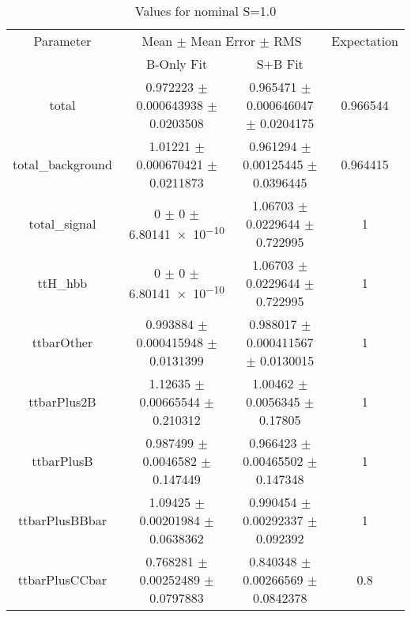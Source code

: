 \begin{table}
\centering
\caption{Values for nominal S=1.0}
\begin{tabular}{cccc}
\toprule
Parameter & \multicolumn{2}{c}{Mean $\pm$ Mean Error $\pm$ RMS} & Expectation\\
 & B-Only Fit & S+B Fit & \\
\midrule
total & \num{0.972223} $\pm$ \num{0.000643938} $\pm$ \num{0.0203508} & \num{0.965471} $\pm$ \num{0.000646047} $\pm$ \num{0.0204175} & \num{0.966544}\\
total\_background & \num{1.01221} $\pm$ \num{0.000670421} $\pm$ \num{0.0211873} & \num{0.961294} $\pm$ \num{0.00125445} $\pm$ \num{0.0396445} & \num{0.964415}\\
total\_signal & \num{0} $\pm$ \num{0} $\pm$ \num{6.80141e-10} & \num{1.06703} $\pm$ \num{0.0229644} $\pm$ \num{0.722995} & \num{1}\\
ttH\_hbb & \num{0} $\pm$ \num{0} $\pm$ \num{6.80141e-10} & \num{1.06703} $\pm$ \num{0.0229644} $\pm$ \num{0.722995} & \num{1}\\
ttbarOther & \num{0.993884} $\pm$ \num{0.000415948} $\pm$ \num{0.0131399} & \num{0.988017} $\pm$ \num{0.000411567} $\pm$ \num{0.0130015} & \num{1}\\
ttbarPlus2B & \num{1.12635} $\pm$ \num{0.00665544} $\pm$ \num{0.210312} & \num{1.00462} $\pm$ \num{0.0056345} $\pm$ \num{0.17805} & \num{1}\\
ttbarPlusB & \num{0.987499} $\pm$ \num{0.0046582} $\pm$ \num{0.147449} & \num{0.966423} $\pm$ \num{0.00465502} $\pm$ \num{0.147348} & \num{1}\\
ttbarPlusBBbar & \num{1.09425} $\pm$ \num{0.00201984} $\pm$ \num{0.0638362} & \num{0.990454} $\pm$ \num{0.00292337} $\pm$ \num{0.092392} & \num{1}\\
ttbarPlusCCbar & \num{0.768281} $\pm$ \num{0.00252489} $\pm$ \num{0.0797883} & \num{0.840348} $\pm$ \num{0.00266569} $\pm$ \num{0.0842378} & \num{0.8}\\
\bottomrule
\end{tabular}
\end{table}